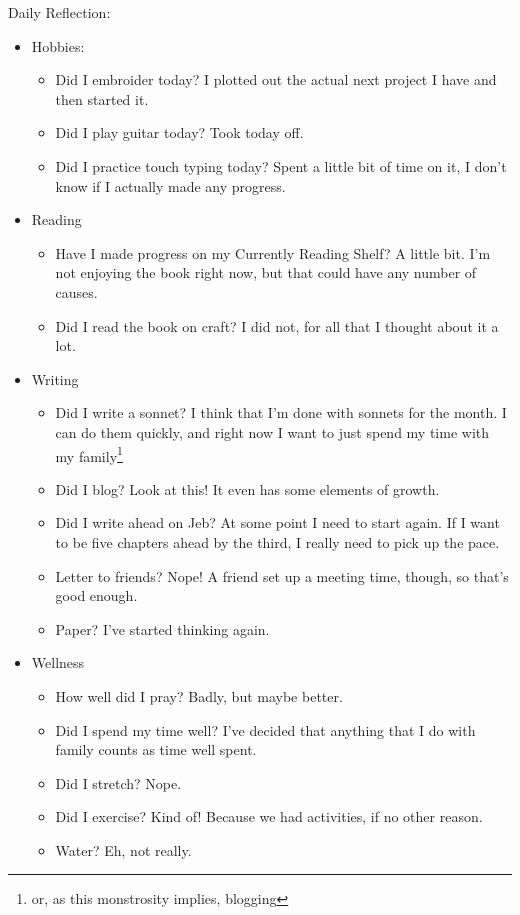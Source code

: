 \documentclass[12pt]{article}[titlepage]
\newcommand{\1}{\={a}}
\newcommand{\2}{\={e}}
\newcommand{\3}{\={\i}}
\newcommand{\4}{\=o}
\newcommand{\5}{\=u}
\newcommand{\6}{\={A}}
\renewcommand{\,}{\textsuperscript{,}}
\begin{document}
Daily Reflection:
\begin{itemize}
\item Hobbies:
\begin{itemize}
\item Did I embroider today? I plotted out the actual next project I have and then started it.
\item Did I play guitar today? Took today off.
\item Did I practice touch typing today? Spent a little bit of time on it, I don't know if I actually made any progress.
\end{itemize}
\item Reading
\begin{itemize}
\item Have I made progress on my Currently Reading Shelf? A little bit. I'm not enjoying the book right now, but that could have any number of causes.
\item Did I read the book on craft? I did not, for all that I thought about it a lot.
\end{itemize}
\item Writing
\begin{itemize}
\item Did I write a sonnet? I think that I'm done with sonnets for the month. I can do them quickly, and right now I want to just spend my time with my family\footnote{or, as this monstrosity implies, blogging}
\item Did I blog? Look at this! It even has some elements of growth.
\item Did I write ahead on Jeb? At some point I need to start again. If I want to be five chapters ahead by the third, I really need to pick up the pace.
\item Letter to friends? Nope! A friend set up a meeting time, though, so that's good enough.
\item Paper? I've started thinking again.
\end{itemize}
\item Wellness
\begin{itemize}
\item How well did I pray? Badly, but maybe better.
\item Did I spend my time well? I've decided that anything that I do with family counts as time well spent.
\item Did I stretch? Nope.
\item Did I exercise? Kind of! Because we had activities, if no other reason.
\item Water? Eh, not really.
\end{itemize}
\end{itemize}
\end{document}
